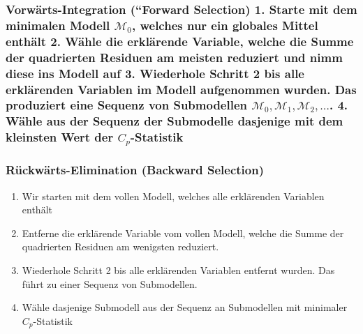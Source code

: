 \documentclass[]{book}
\providecommand{\tightlist}{%
  \setlength{\itemsep}{0pt}\setlength{\parskip}{0pt}}
\begin{document}
\subsubsection{\texorpdfstring{Vorwärts-Integration (``Forward
Selection) 1. Starte mit dem minimalen Modell \(\mathcal{M}_0\), welches
nur ein globales Mittel enthält 2. Wähle die erklärende Variable, welche
die Summe der quadrierten Residuen am meisten reduziert und nimm diese
ins Modell auf 3. Wiederhole Schritt 2 bis alle erklärenden Variablen im
Modell aufgenommen wurden. Das produziert eine Sequenz von Submodellen
\(\mathcal{M}_0, \mathcal{M}_1, \mathcal{M}_2, \ldots\). 4. Wähle aus
der Sequenz der Submodelle dasjenige mit dem kleinsten Wert der
\(C_p\)-Statistik}{Vorwärts-Integration (``Forward Selection) 1. Starte mit dem minimalen Modell \textbackslash{}mathcal\{M\}\_0, welches nur ein globales Mittel enthält 2. Wähle die erklärende Variable, welche die Summe der quadrierten Residuen am meisten reduziert und nimm diese ins Modell auf 3. Wiederhole Schritt 2 bis alle erklärenden Variablen im Modell aufgenommen wurden. Das produziert eine Sequenz von Submodellen \textbackslash{}mathcal\{M\}\_0, \textbackslash{}mathcal\{M\}\_1, \textbackslash{}mathcal\{M\}\_2, \textbackslash{}ldots. 4. Wähle aus der Sequenz der Submodelle dasjenige mit dem kleinsten Wert der C\_p-Statistik}}\label{vorwarts-integration-forward-selection-1.-starte-mit-dem-minimalen-modell-mathcalm_0-welches-nur-ein-globales-mittel-enthalt-2.-wahle-die-erklarende-variable-welche-die-summe-der-quadrierten-residuen-am-meisten-reduziert-und-nimm-diese-ins-modell-auf-3.-wiederhole-schritt-2-bis-alle-erklarenden-variablen-im-modell-aufgenommen-wurden.-das-produziert-eine-sequenz-von-submodellen-mathcalm_0-mathcalm_1-mathcalm_2-ldots.-4.-wahle-aus-der-sequenz-der-submodelle-dasjenige-mit-dem-kleinsten-wert-der-c_p-statistik}

\subsubsection{Rückwärts-Elimination (Backward
Selection)}\label{ruckwarts-elimination-backward-selection}

\begin{enumerate}
\def\labelenumi{\arabic{enumi}.}
\tightlist
\item
  Wir starten mit dem vollen Modell, welches alle erklärenden Variablen
  enthält
\item
  Entferne die erklärende Variable vom vollen Modell, welche die Summe
  der quadrierten Residuen am wenigsten reduziert.
\item
  Wiederhole Schritt 2 bis alle erklärenden Variablen entfernt wurden.
  Das führt zu einer Sequenz von Submodellen.
\item
  Wähle dasjenige Submodell aus der Sequenz an Submodellen mit minimaler
  \(C_p\)-Statistik
\end{enumerate}
\end{document}
